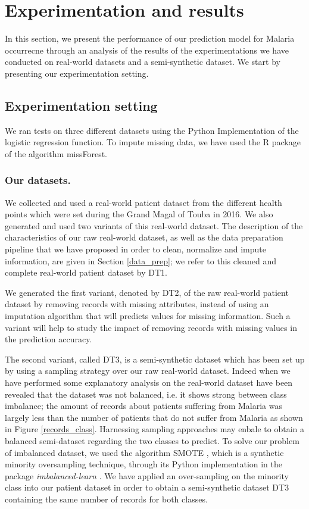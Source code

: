 \section{Experimentation and results}\label{experimentation}
In this section, we present the performance of our prediction
 model for Malaria occurrecne through an analysis of the results
 of the experimentations we have conducted on real-world datasets
and a semi-synthetic dataset. We start by presenting our experimentation setting.
 
\subsection{Experimentation setting}
We ran tests on three different datasets using the Python Implementation of the logistic regression function.
To impute missing data, we have used the R package of the algorithm missForest.

\subsubsection{Our datasets.}
We collected and used a real-world patient dataset from the different health points which were set during the Grand Magal of Touba in 2016.
We also generated and used two variants of this real-world dataset. The description of the characteristics of our raw real-world dataset, as well as the  data preparation
pipeline that we have proposed in order to clean, normalize and impute information, are given in Section \ref{data_prep}; we refer to this cleaned and complete real-world
patient dataset by \textsc{DT1}. 

We generated the first variant, denoted by \textsc{DT2}, of the raw real-world patient dataset by 
removing records with missing attributes, instead of using an imputation algorithm that will predicts 
values for missing information. Such a variant will help to study the impact of removing records with 
missing values in the prediction accuracy.
 
The second variant, called \textsc{DT3}, is a semi-synthetic dataset which has been set up by using a 
sampling strategy over our raw real-world dataset. Indeed when we have performed some explanatory analysis 
on the real-world dataset have been revealed that the dataset was not balanced, i.e. it shows strong between
class imbalance; the amount of records about patients suffering from Malaria was largely less than the number
of patients that do not suffer from Malaria as shown in Figure \ref{records_class}. Harnessing sampling approaches may enbale to obtain a balanced 
semi-dataset regarding the two classes to predict. To solve our problem of imbalanced dataset, we used the 
algorithm SMOTE \cite{Wa06}, which is a synthetic minority oversampling technique, through its Python implementation
in the  package \emph{imbalanced-learn} \cite{Gu17}. We have applied an over-sampling on the minority class into our patient 
dataset in order to obtain a semi-synthetic dataset \textsc{DT3} containing the same number of records for both classes.  

